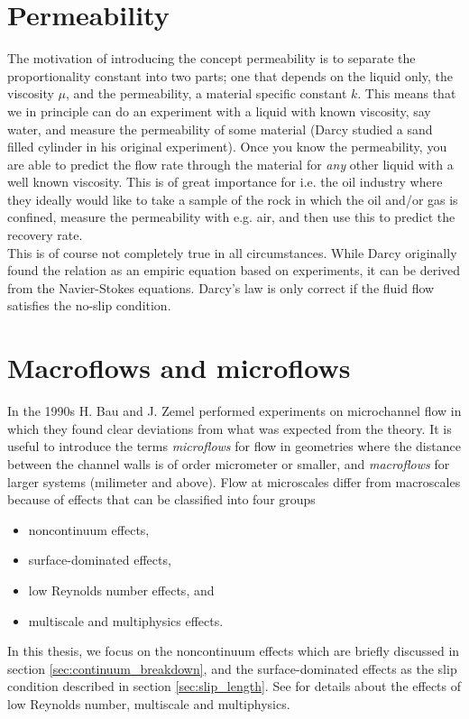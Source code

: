 \section{Permeability}
\label{sec:permeability}
The motivation of introducing the concept permeability is to separate the proportionality constant into two parts; one that depends on the liquid only, the viscosity $\mu$, and the permeability, a material specific constant $k$. This means that we in principle can do an experiment with a liquid with known viscosity, say water, and measure the permeability of some material (Darcy studied a sand filled cylinder in his original experiment). Once you know the permeability, you are able to predict the flow rate through the material for \textit{any} other liquid with a well known viscosity. This is of great importance for i.e. the oil industry where they ideally would like to take a sample of the rock in which the oil and/or gas is confined, measure the permeability with e.g. air, and then use this to predict the recovery rate.\\
This is of course not completely true in all circumstances. While Darcy originally found the relation as an empiric equation based on experiments, it can be derived from the Navier-Stokes equations. Darcy's law is only correct if the fluid flow satisfies the no-slip condition.
\section{Macroflows and microflows}
\label{sec:theory_of_fluids_microflows}
In the 1990s H. Bau and J. Zemel performed experiments on microchannel flow in which they found clear deviations from what was expected from the theory\cite{karniadakis2005microflows}. It is useful to introduce the terms \textit{microflows} for flow in geometries where the distance between the channel walls is of order micrometer or smaller, and \textit{macroflows} for larger systems (milimeter and above). Flow at microscales differ from macroscales because of effects that can be classified into four groups
\begin{itemize}
\item noncontinuum effects,
\item surface-dominated effects,
\item low Reynolds number effects, and
\item multiscale and multiphysics effects.
\end{itemize}
In this thesis, we focus on the noncontinuum effects which are briefly discussed in section \ref{sec:continuum_breakdown}, and the surface-dominated effects as the slip condition described in section \ref{sec:slip_length}. See \cite{karniadakis2005microflows} for details about the effects of low Reynolds number, multiscale and multiphysics. 

